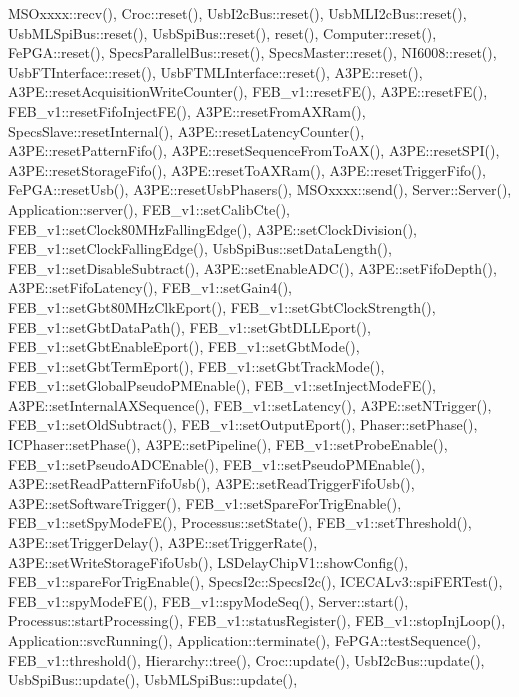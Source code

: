 M\+S\+Oxxxx\+::recv(), Croc\+::reset(), Usb\+I2c\+Bus\+::reset(), Usb\+M\+L\+I2c\+Bus\+::reset(), Usb\+M\+L\+Spi\+Bus\+::reset(), Usb\+Spi\+Bus\+::reset(), reset(), Computer\+::reset(), Fe\+P\+G\+A\+::reset(), Specs\+Parallel\+Bus\+::reset(), Specs\+Master\+::reset(), N\+I6008\+::reset(), Usb\+F\+T\+Interface\+::reset(), Usb\+F\+T\+M\+L\+Interface\+::reset(), A3\+P\+E\+::reset(), A3\+P\+E\+::reset\+Acquisition\+Write\+Counter(), F\+E\+B\+\_\+v1\+::reset\+F\+E(), A3\+P\+E\+::reset\+F\+E(), F\+E\+B\+\_\+v1\+::reset\+Fifo\+Inject\+F\+E(), A3\+P\+E\+::reset\+From\+A\+X\+Ram(), Specs\+Slave\+::reset\+Internal(), A3\+P\+E\+::reset\+Latency\+Counter(), A3\+P\+E\+::reset\+Pattern\+Fifo(), A3\+P\+E\+::reset\+Sequence\+From\+To\+A\+X(), A3\+P\+E\+::reset\+S\+P\+I(), A3\+P\+E\+::reset\+Storage\+Fifo(), A3\+P\+E\+::reset\+To\+A\+X\+Ram(), A3\+P\+E\+::reset\+Trigger\+Fifo(), Fe\+P\+G\+A\+::reset\+Usb(), A3\+P\+E\+::reset\+Usb\+Phasers(), M\+S\+Oxxxx\+::send(), Server\+::\+Server(), Application\+::server(), F\+E\+B\+\_\+v1\+::set\+Calib\+Cte(), F\+E\+B\+\_\+v1\+::set\+Clock80\+M\+Hz\+Falling\+Edge(), A3\+P\+E\+::set\+Clock\+Division(), F\+E\+B\+\_\+v1\+::set\+Clock\+Falling\+Edge(), Usb\+Spi\+Bus\+::set\+Data\+Length(), F\+E\+B\+\_\+v1\+::set\+Disable\+Subtract(), A3\+P\+E\+::set\+Enable\+A\+D\+C(), A3\+P\+E\+::set\+Fifo\+Depth(), A3\+P\+E\+::set\+Fifo\+Latency(), F\+E\+B\+\_\+v1\+::set\+Gain4(), F\+E\+B\+\_\+v1\+::set\+Gbt80\+M\+Hz\+Clk\+Eport(), F\+E\+B\+\_\+v1\+::set\+Gbt\+Clock\+Strength(), F\+E\+B\+\_\+v1\+::set\+Gbt\+Data\+Path(), F\+E\+B\+\_\+v1\+::set\+Gbt\+D\+L\+L\+Eport(), F\+E\+B\+\_\+v1\+::set\+Gbt\+Enable\+Eport(), F\+E\+B\+\_\+v1\+::set\+Gbt\+Mode(), F\+E\+B\+\_\+v1\+::set\+Gbt\+Term\+Eport(), F\+E\+B\+\_\+v1\+::set\+Gbt\+Track\+Mode(), F\+E\+B\+\_\+v1\+::set\+Global\+Pseudo\+P\+M\+Enable(), F\+E\+B\+\_\+v1\+::set\+Inject\+Mode\+F\+E(), A3\+P\+E\+::set\+Internal\+A\+X\+Sequence(), F\+E\+B\+\_\+v1\+::set\+Latency(), A3\+P\+E\+::set\+N\+Trigger(), F\+E\+B\+\_\+v1\+::set\+Old\+Subtract(), F\+E\+B\+\_\+v1\+::set\+Output\+Eport(), Phaser\+::set\+Phase(), I\+C\+Phaser\+::set\+Phase(), A3\+P\+E\+::set\+Pipeline(), F\+E\+B\+\_\+v1\+::set\+Probe\+Enable(), F\+E\+B\+\_\+v1\+::set\+Pseudo\+A\+D\+C\+Enable(), F\+E\+B\+\_\+v1\+::set\+Pseudo\+P\+M\+Enable(), A3\+P\+E\+::set\+Read\+Pattern\+Fifo\+Usb(), A3\+P\+E\+::set\+Read\+Trigger\+Fifo\+Usb(), A3\+P\+E\+::set\+Software\+Trigger(), F\+E\+B\+\_\+v1\+::set\+Spare\+For\+Trig\+Enable(), F\+E\+B\+\_\+v1\+::set\+Spy\+Mode\+F\+E(), Processus\+::set\+State(), F\+E\+B\+\_\+v1\+::set\+Threshold(), A3\+P\+E\+::set\+Trigger\+Delay(), A3\+P\+E\+::set\+Trigger\+Rate(), A3\+P\+E\+::set\+Write\+Storage\+Fifo\+Usb(), L\+S\+Delay\+Chip\+V1\+::show\+Config(), F\+E\+B\+\_\+v1\+::spare\+For\+Trig\+Enable(), Specs\+I2c\+::\+Specs\+I2c(), I\+C\+E\+C\+A\+Lv3\+::spi\+F\+E\+R\+Test(), F\+E\+B\+\_\+v1\+::spy\+Mode\+F\+E(), F\+E\+B\+\_\+v1\+::spy\+Mode\+Seq(), Server\+::start(), Processus\+::start\+Processing(), F\+E\+B\+\_\+v1\+::status\+Register(), F\+E\+B\+\_\+v1\+::stop\+Inj\+Loop(), Application\+::svc\+Running(), Application\+::terminate(), Fe\+P\+G\+A\+::test\+Sequence(), F\+E\+B\+\_\+v1\+::threshold(), Hierarchy\+::tree(), Croc\+::update(), Usb\+I2c\+Bus\+::update(), Usb\+Spi\+Bus\+::update(), Usb\+M\+L\+Spi\+Bus\+::update(), 